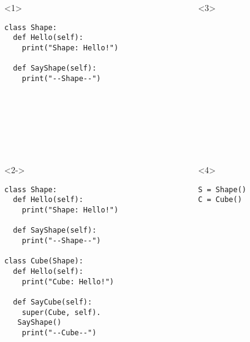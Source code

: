\begin{frame}[fragile]{}

  \begin{columns}[onlytextwidth]
    \begin{column}{0.47\textwidth}

      \begin{onlyenv}<1>
        \begin{lstlisting}[style=python,basicstyle=\ttfamily\footnotesize]
class Shape:
  def Hello(self):
    print("Shape: Hello!")

  def SayShape(self):
    print("--Shape--")








 \end{lstlisting}
      \end{onlyenv}

      \begin{onlyenv}<2->
        \begin{lstlisting}[style=python,basicstyle=\ttfamily\footnotesize]
class Shape:
  def Hello(self):
    print("Shape: Hello!")

  def SayShape(self):
    print("--Shape--")

class Cube(Shape):
  def Hello(self):
    print("Cube: Hello!")

  def SayCube(self):
    super(Cube, self).
   SayShape()
    print("--Cube--") \end{lstlisting}
      \end{onlyenv}

    \end{column}


    \begin{column}{0.47\textwidth}

      \begin{onlyenv}<3>
        \begin{lstlisting}[style=python,basicstyle=\ttfamily\footnotesize]














 \end{lstlisting}
      \end{onlyenv}

      \begin{onlyenv}<4>
        \begin{lstlisting}[style=python,basicstyle=\ttfamily\footnotesize]
S = Shape()
C = Cube()













\end{lstlisting}
\end{onlyenv}
\end{column}
\end{columns}
\end{frame}
